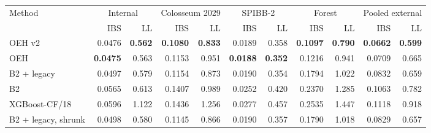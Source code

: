 \begin{tabular}{lrrrrrrrrrr}
\toprule
Method & \multicolumn{2}{c}{Internal} & \multicolumn{2}{c}{Colosseum 2029} & \multicolumn{2}{c}{SPIBB-2} & \multicolumn{2}{c}{Forest} & \multicolumn{2}{c}{Pooled external} \\
 & IBS & LL & IBS & LL & IBS & LL & IBS & LL & IBS & LL \\
\midrule
OEH v2 & 0.0476 & \textbf{0.562} & \textbf{0.1080} & \textbf{0.833} & 0.0189 & 0.358 & \textbf{0.1097} & \textbf{0.790} & \textbf{0.0662} & \textbf{0.599} \\
OEH & \textbf{0.0475} & 0.563 & 0.1153 & 0.951 & \textbf{0.0188} & \textbf{0.352} & 0.1216 & 0.941 & 0.0709 & 0.665 \\
B2 + legacy & 0.0497 & 0.579 & 0.1154 & 0.873 & 0.0190 & 0.354 & 0.1794 & 1.022 & 0.0832 & 0.659 \\
B2 & 0.0565 & 0.613 & 0.1407 & 0.989 & 0.0252 & 0.420 & 0.2370 & 1.285 & 0.1063 & 0.782 \\
XGBoost-CF/18 & 0.0596 & 1.122 & 0.1436 & 1.256 & 0.0277 & 0.457 & 0.2535 & 1.447 & 0.1118 & 0.918 \\
B2 + legacy, shrunk & 0.0498 & 0.580 & 0.1145 & 0.866 & 0.0190 & 0.357 & 0.1790 & 1.018 & 0.0829 & 0.657 \\
\bottomrule
\end{tabular}
